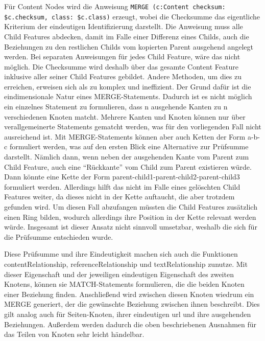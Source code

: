     Für Content Nodes wird die Anweisung
    \texttt{MERGE (c:Content {checksum: \$c.checksum, class: \$c.class})} erzeugt,
    wobei die Checksumme das eigentliche Kriterium der eindeutigen Identifizierung darstellt.
    Die Anweisung muss alle Child Features abdecken, damit im Falle einer Differenz eines Childs,
    auch die Beziehungen zu den restlichen Childs vom kopierten Parent ausgehend angelegt werden.
    Bei separaten Anweisungen für jedes Child Feature, wäre das nicht möglich.
    Die Checksumme wird deshalb über das gesamte Content Feature inklusive aller seiner Child Features gebildet.
    Andere Methoden, um dies zu erreichen, erweisen sich als zu komplex und ineffizient.
    Der Grund dafür ist die eindimensionale Natur eines MERGE-Statements.
    Dadurch ist es nicht möglich ein einzelnes Statement zu formulieren,
    dass n ausgehende Kanten zu n verschiedenen Knoten matcht.
    Mehrere Kanten und Knoten können nur über verallgemeinerte Statements gematcht werden,
    was für den vorliegenden Fall nicht ausreichend ist.
    Mit MERGE-Statements können aber auch Ketten der Form a-b-c formuliert werden,
    was auf den ersten Blick eine Alternative zur Prüfsumme darstellt.
    Nämlich dann, wenn neben der ausgehenden Kante vom Parent zum Child Feature,
    auch eine "`Rückkante"' vom Child zum Parent existieren würde.
    Dann könnte eine Kette der Form parent-child1-parent-child2-parent-child3 formuliert werden.
    Allerdings hilft das nicht im Falle eines gelöschten Child Features weiter,
    da dieses nicht in der Kette auftaucht, die aber trotzdem gefunden wird.
    Um diesen Fall abzufangen müssten die Child Features zusätzlich einen Ring bilden,
    wodurch allerdings ihre Position in der Kette relevant werden würde.
    Insgesamt ist dieser Ansatz nicht sinnvoll umsetzbar,
    weshalb die sich für die Prüfsumme entschieden wurde.

    Diese Prüfsumme und ihre Eindeutigkeit machen sich auch die Funktionen
    contentRelationship, referenceRelationship und textRelationship zunutze.
    Mit dieser Eigenschaft und der jeweiligen eindeutigen Eigenschaft des zweiten
    Knotens, können sie MATCH-Statements formulieren,
    die die beiden Knoten einer Beziehung finden.
    Anschließend wird zwischen diesen Knoten wiedrum ein MERGE generiert,
    der die gewünschte Beziehung zwischen ihnen beschreibt.
    Dies gilt analog auch für Seiten-Knoten, ihrer eindeutigen \gls{url}
    und ihre ausgehenden Beziehungen.
    Außerdem werden dadurch die oben beschriebenen Ausnahmen für das Teilen von Knoten sehr leicht händelbar.
